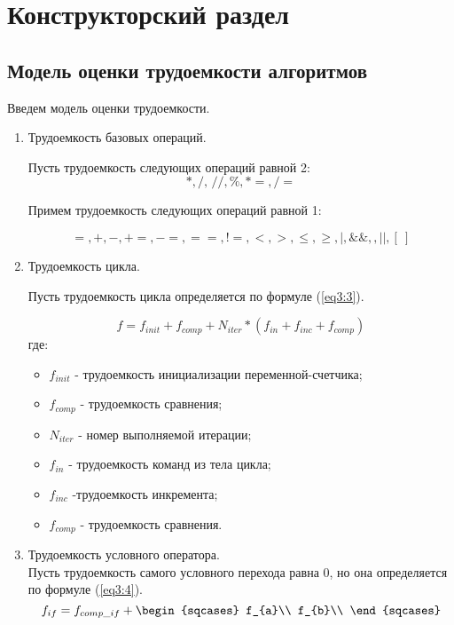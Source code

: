 \chapter{Конструкторский раздел}

\section{Модель оценки трудоемкости алгоритмов}
Введем модель оценки трудоемкости.

\begin{enumerate}
	\item Трудоемкость базовых операций.
	
	Пусть трудоемкость следующих операций равной 2: 
	$$
		\label{eq3:1}
		*, /, \, //, \%, *=, /=
	$$
	
	Примем трудоемкость следующих операций равной 1:
	
	$$
		\label{eq3:2}
		=, +, -, +=, -=, ==, !=, <, >, \leq, \geq, |, \&\&,, ||, [\ ]
	$$

	\item Трудоемкость цикла.
	
	Пусть трудоемкость цикла определяется по формуле (\ref{eq3:3}).
	
	\begin{equation}
		\label{eq3:3} 
		f = f_{init} + f_{comp} + N_{iter} * (f_{in} + f_{inc} + f_{comp})
	\end{equation} 
	где:
	\begin{itemize}
		\item $f_{init}$ - трудоемкость инициализации переменной-счетчика;
		\item $f_{comp}$ - трудоемкость сравнения;
		\item $N_{iter}$ - номер выполняемой итерации;
		\item $f_{in}$ - трудоемкость команд из тела цикла;
		\item $f_{inc}$ -трудоемкость инкремента;
		\item $f_{comp}$ - трудоемкость сравнения.
	\end{itemize}
	\item Трудоемкость условного оператора. \\
	Пусть трудоемкость самого условного перехода равна 0, но она определяется по формуле (\ref{eq3:4}). 
	\begin{equation}
		\label{eq3:4}
		f_{if} = f_{comp\_if} +
		\begin{sqcases}
			f_{a}\\
			f_{b}\\
		\end{sqcases}
	\end{equation}
	
\end{enumerate}


